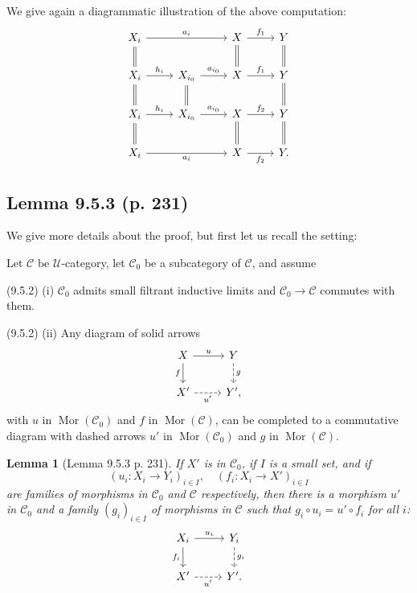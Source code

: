\documentclass[12pt]{article}%
\newtheorem{lem}[thm]{Lemma}
\theoremstyle{remark}
\theoremstyle{definition}
\newcommand{\nn}{\noindent}
\newcommand{\C}{\mathcal C}
\newcommand{\U}{\mathcal U}
\DeclareMathOperator{\Mor}{Mor}
\begin{document}
We give again a diagrammatic illustration of the above computation:
$$
\begin{tikzcd}
X_i\ar[equal]{d}\ar{rr}{a_i}&&X\ar[equal]{d}\ar{r}{f_1}&Y\ar[equal]{d}\\ 
X_i\ar[equal]{d}\ar{r}{h_i}&X_{i_0}\ar[equal]{d}\ar{r}{a_{i_0}}&X\ar{r}{f_1}&Y\ar[equal]{d}\\ 
X_i\ar[equal]{d}\ar{r}{h_i}&X_{i_0}\ar{r}{a_{i_0}}&X\ar[equal]{d}\ar{r}{f_2}&Y\ar[equal]{d}\\ 
X_i\ar{rr}[swap]{a_i}&&X\ar{r}[swap]{f_2}&Y.
\end{tikzcd}
$$ 


\subsection{Lemma 9.5.3 (p. 231)}

We give more details about the proof, but first let us recall the setting:

Let $\C$ be $\U$-category, let $\C_0$ be a subcategory of $\C$, and assume 

\nn(9.5.2) (i) $\C_0$ admits small filtrant inductive limits and $\C_0\to\C$ commutes with them.

\nn(9.5.2) (ii) Any diagram of solid arrows
%
\begin{equation}\label{952ii}
\begin{tikzcd}
X\ar{d}[swap]{f}\ar{r}{u}&Y\ar[dashed]{d}{g}\\ 
X'\ar[dashed]{r}[swap]{u'}&Y',
\end{tikzcd}
\end{equation}
%
with $u$ in $\Mor(\C_0)$ and $f$ in $\Mor(\C)$, can be completed to a commutative diagram with dashed arrows $u'$ in $\Mor(\C_0)$ and $g$ in $\Mor(\C)$.

\begin{lem}[Lemma 9.5.3 p. 231]
If $X'$ is in $\C_0$, if $I$ is a small set, and if  
$$
(u_i:X_i\to Y_i)_{i\in I},\quad(f_i:X_i\to X')_{i\in I}
$$ 
are families of morphisms in $\C_0$ and $\C$ respectively, then there is a morphism $u'$ in $\C_0$ and a family $(g_i)_{i\in I}$ of morphisms in $\C$ such that $g_i\circ u_i=u'\circ f_i$ for all $i$:
$$
\begin{tikzcd}
X_i\ar{d}[swap]{f_i}\ar{r}{u_i}&Y_i\ar[dashed]{d}{g_i}\\ 
X'\ar[dashed]{r}[swap]{u'}&Y'.
\end{tikzcd}
$$ 
\end{lem}
\end{document}
